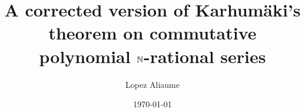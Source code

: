 \title{A corrected version of Karhumäki’s theorem
       on commutative polynomial $\mathbb{N}$-rational series}
\author{
    Lopez Aliaume
}
\date{\today}


\newcommand{\acknowledge}{
    I would like to thank Gaëtan Douéneau-Tabot
    for mentionning this problem, checking 
    my counter-example, and supporting me in publishing
    this paper.
}

\newcommand{\makeabstract}{
    \begin{abstract}
        Deciding whether a $\Rel$-rational series
        can be computed as a $\Nat$-rational series
        is an open problem that was solved by Karhumäki in the
        specific case of $\Rel$-rational series that are commutative
        and compute a polynomial.
        We propose a short counter-example to this
        previous result on commutative $\Nat$-rational series,
        and prove a corrected version of the theorem, that only
        requires commutativity and a polynomial growth rate.
        We then discuss how the syntactic criterion could
        pave the way towards a decision procedure when the commutativity
        of the $\Rel$-rational series
        is not assumed.
    \end{abstract}
}
